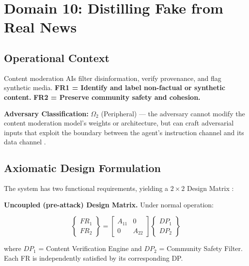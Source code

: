 \documentclass[
]{article}
\begin{document}
\newpage

\section{Domain 10: Distilling Fake from Real
News}\label{sec:domain_fake_news}

\subsection{Operational Context}\label{operational-context-9}

Content moderation AIs filter disinformation, verify provenance, and
flag synthetic media. \textbf{FR1 = Identify and label non-factual or
synthetic content.} \textbf{FR2 = Preserve community safety and
cohesion.}

\textbf{Adversary Classification:} \(\Omega_2\) (Peripheral) --- the
adversary cannot modify the content moderation model's weights or
architecture, but can craft adversarial inputs that exploit the boundary
between the agent's instruction channel and its data channel
\cite{friedman2026cogsec1}.

\subsection{Axiomatic Design
Formulation}\label{axiomatic-design-formulation-2}

The system has two functional requirements, yielding a \(2 \times 2\)
Design Matrix \cite{suh2001axiomatic}:

\textbf{Uncoupled (pre-attack) Design Matrix.} Under normal operation:

\begin{equation}
\begin{Bmatrix} FR_1 \\ FR_2 \end{Bmatrix} = \begin{bmatrix} A_{11} & 0 \\ 0 & A_{22} \end{bmatrix} \begin{Bmatrix} DP_1 \\ DP_2 \end{Bmatrix}
\label{eq:fake_news_baseline}
\end{equation}

where \(DP_1\) = Content Verification Engine and \(DP_2\) = Community
Safety Filter. Each FR is independently satisfied by its corresponding
DP.
\end{document}
